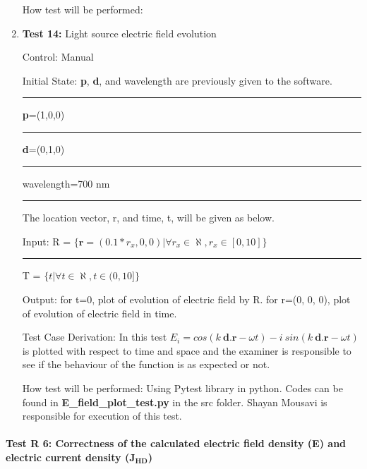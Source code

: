 \documentclass[12pt, titlepage]{article}
\begin{document}
\begin{enumerate}
	How test will be performed: 
	
\item{\textbf{Test 14:} Light source electric field evolution}

Control: Manual 

Initial State:  \textbf{p}, \textbf{d}, and wavelength are previously given to the software. \\
\rule{2.3cm}{0pt} \textbf{p}=(1,0,0)\\
\rule{2.3cm}{0pt} \textbf{d}=(0,1,0)\\
\rule{2.3cm}{0pt} wavelength=700 nm\\
\rule{2.3cm}{0pt} The location vector, r, and time, t, will be given as below.  

Input: R = $\{\textbf{r}=(0.1*r_x,0,0)| \forall r_x \in \aleph, r_x \in [0,10]\}$\\
\rule{1.3cm}{0pt}T = $\{t| \forall t \in \aleph, t \in (0,10]\}$

Output: for t=0, plot of evolution of electric field by R. for r=(0, 0, 0), plot of evolution of electric field in time.

Test Case Derivation: In this test $E_i = cos(k\  \textbf{d.} \textbf{r} - \omega t) - i \ sin(k\  \textbf{d.} \textbf{r} - \omega t)$ is plotted with respect to time and space and the examiner is responsible to see if the behaviour of the function is as expected or not.   

How test will be performed: Using Pytest library in python. Codes can be found in \textbf{E\_field\_plot\_test.py } in the src folder. Shayan Mousavi is responsible for execution of this test. 
	
\end{enumerate}

\paragraph{Test R 6: Correctness of the calculated electric field density (E) and electric current density (J$_\textbf{{HD}}$)}
	
\end{document}
